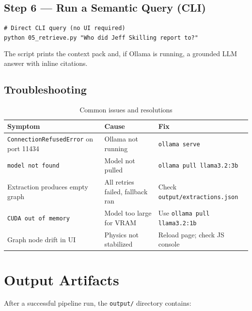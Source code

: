 \documentclass[12pt,a4paper]{article}
\begin{document}
\subsection{Step 6 — Run a Semantic Query (CLI)}

\begin{lstlisting}[style=bashstyle]
# Direct CLI query (no UI required)
python 05_retrieve.py "Who did Jeff Skilling report to?"
\end{lstlisting}

The script prints the context pack and, if Ollama is running, a grounded LLM answer with inline citations.

\subsection{Troubleshooting}

\begin{table}[H]
\centering
\begin{tabular}{@{}lll@{}}
\toprule
\textbf{Symptom} & \textbf{Cause} & \textbf{Fix} \\ \midrule
\texttt{ConnectionRefusedError} on port 11434 & Ollama not running & \texttt{ollama serve} \\
\texttt{model not found} & Model not pulled & \texttt{ollama pull llama3.2:3b} \\
Extraction produces empty graph & All retries failed, fallback ran & Check \texttt{output/extractions.json} \\
\texttt{CUDA out of memory} & Model too large for VRAM & Use \texttt{ollama pull llama3.2:1b} \\
Graph node drift in UI & Physics not stabilized & Reload page; check JS console \\
\bottomrule
\end{tabular}
\caption{Common issues and resolutions}
\end{table}

\section{Output Artifacts}

After a successful pipeline run, the \texttt{output/} directory contains:
\end{document}

